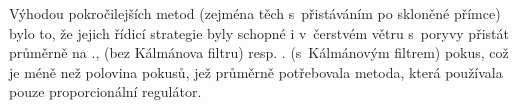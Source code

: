 Výhodou pokročilejších metod (zejména těch s~přistáváním po skloněné přímce) bylo to, že jejich řídicí strategie byly schopné i v~čerstvém větru s~poryvy přistát průměrně na \landingRetriesMeanLAPILvitrIV., (bez Kálmánova filtru) resp. \landingRetriesMeanKAPILvitrIV. (s~Kálmánovým filtrem) pokus, což je méně než polovina pokusů, jež průměrně potřebovala metoda, která používala pouze proporcionální regulátor.

